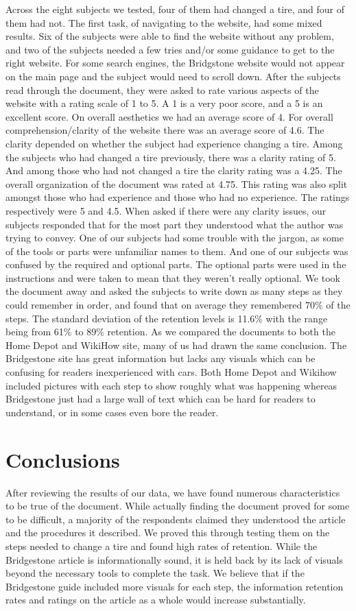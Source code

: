 \documentclass[12pt,A4paper]{article}
\begin{document}
	Across the eight subjects we tested, four of them had changed a tire, and four of them had not. The first task, of navigating to the website, had some mixed results. Six of the subjects were able to find the website without any problem, and two of the subjects needed a few tries and/or some guidance to get to the right website. For some search engines, the Bridgstone website would not appear on the main page and the subject would need to scroll down. After the subjects read through the document, they were asked to rate various aspects of the website with a rating scale of 1 to 5. A 1 is a very poor score, and a 5 is an excellent score. On overall aesthetics we had an average score of 4. For overall comprehension/clarity of the website there was an average score of 4.6. The clarity depended on whether the subject had experience changing a tire. Among the subjects who had changed a tire previously, there was a clarity rating of 5. And among those who had not changed a tire the clarity rating was a 4.25. The overall organization of the document was rated at 4.75. This rating was also split amongst those who had experience and those who had no experience. The ratings respectively were 5 and 4.5. When asked if there were any clarity issues, our subjects responded that for the most part they understood what the author was trying to convey. One of our subjects had some trouble with the jargon, as some of the tools or parts were unfamiliar names to them. And one of our subjects was confused by the required and optional parts. The optional parts were used in the instructions and were taken to mean that they weren’t really optional. We took the document away and asked the subjects to write down as many steps as they could remember in order, and found that on average they remembered 70\% of the steps. The standard deviation of the retention levels is 11.6\% with the range being from 61\% to 89\% retention. As we compared the documents to both the Home Depot and WikiHow site, many of us had drawn the same conclusion. The Bridgestone site has great information but lacks any visuals which can be confusing for readers inexperienced with cars. Both Home Depot and Wikihow included pictures with each step to show roughly what was happening whereas Bridgestone just had a large wall of text which can be hard for readers to understand, or in some cases even bore the reader.

	\section{Conclusions}
	After reviewing the results of our data, we have found numerous characteristics to be true of the document. While actually finding the document proved for some to be difficult, a majority of the respondents claimed they understood the article and the procedures it described. We proved this through testing them on the steps needed to change a tire and found high rates of retention. While the Bridgestone article is informationally sound, it is held back by its lack of visuals beyond the necessary tools to complete the task. We believe that if the Bridgestone guide included more visuals for each step, the information retention rates and ratings on the article as a whole would increase substantially.
	\vspace{3 in}
\end{document}
